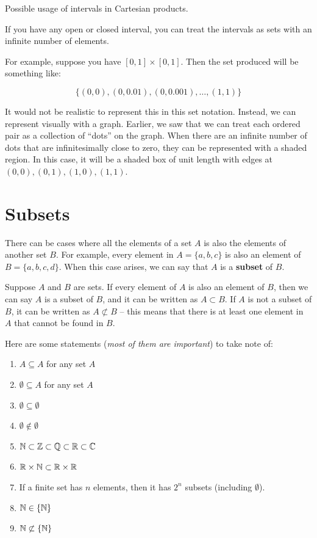 \documentclass[../Latex-Setup/setup.tex]{subfiles}
\begin{document}
\begin{remark}
    Possible usage of intervals in Cartesian products.\par

    If you have any open or closed interval, you can treat the intervals as sets with an infinite number of elements.\par
    For example, suppose you have $[0, 1] \times [0, 1]$. Then the set produced will be something like:
    
    \[\{(0,0), (0,0.01), (0,0.001), \dots, (1,1)\}\]
    
    It would not be realistic to represent this in this set notation. Instead, we can represent visually with a graph.
    Earlier, we saw that we can treat each ordered pair as a collection of ``dots'' on the graph.
    When there are an infinite number of dots that are infinitesimally close to zero, they can be represented with a shaded region.
    In this case, it will be a shaded box of unit length with edges at $(0,0), (0,1), (1,0), (1,1)$.
\end{remark}

\section{Subsets}

\indent There can be cases where all the elements of a set $A$ is also the elements of another set $B$. For example,
every element in $A = \{a,b,c\}$ is also an element of $B = \{a,b,c,d\}$. When this case arises, we can say that $A$ is a \textbf{subset} of $B$.\par

\indent Suppose $A$ and $B$ are sets. If every element of $A$ is also an element of $B$, then we can say $A$ is a subset of $B$,
and it can be written as $A \subset B$. If $A$ is not a subset of $B$, it can be written as $A \not\subset B$ -- this means
that there is at least one element in $A$ that cannot be found in $B$.\par

\indent Here are some statements (\textit{most of them are important}) to take note of:
\begin{enumerate}
    \item $A \subseteq A$ for any set $A$
    \item $\emptyset \subseteq A$ for any set $A$
    \item $\emptyset \subseteq \emptyset$
    \item $\emptyset \notin \emptyset$
    \item $\mathbb N \subset \mathbb Z \subset \mathbb Q \subset \mathbb R \subset \mathbb C$
    \item $\mathbb R \times \mathbb N \subset \mathbb R \times \mathbb R$
    \item If a finite set has $n$ elements, then it has $2^n$ subsets (including $\emptyset$).
    \item $\mathbb N \in \{\mathbb N\}$
    \item $\mathbb N \not\subset \{\mathbb N\}$
\end{enumerate}
\par
\end{document}
